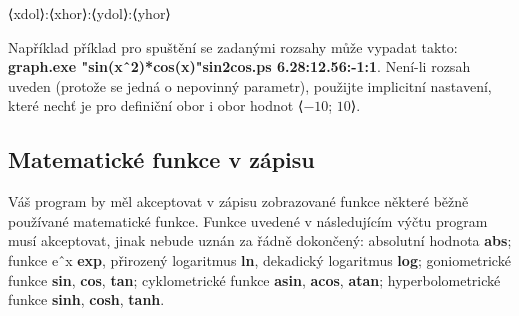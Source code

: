 \documentclass[../main.tex]{subfiles}
\begin{document}
{\centering ⟨xdol⟩:⟨xhor⟩:⟨ydol⟩:⟨yhor⟩ \par}

\vspace{0.5em}

Například příklad pro spuštění se zadanými rozsahy může vypadat takto: \textbf{graph.exe "sin(xˆ2)*cos(x)"\:sin2cos.ps 6.28:12.56:-1:1}. Není-li rozsah uveden (protože se jedná o nepovinný parametr), použijte implicitní nastavení,
které nechť je pro definiční obor i obor hodnot ⟨$-10$; $10$⟩.

\newpage
\subsection{Matematické funkce v zápisu}
Váš program by měl akceptovat v zápisu zobrazované funkce některé běžně používané matematické funkce. Funkce uvedené v následujícím výčtu program musí akceptovat, jinak nebude uznán
za řádně dokončený: absolutní hodnota \textbf{abs}; funkce eˆx \textbf{exp}, přirozený logaritmus \textbf{ln}, dekadický
logaritmus \textbf{log}; goniometrické funkce \textbf{sin}, \textbf{cos}, \textbf{tan}; cyklometrické funkce \textbf{asin}, \textbf{acos}, \textbf{atan}; hyperbolometrické funkce \textbf{sinh}, \textbf{cosh}, \textbf{tanh}.
\end{document}
